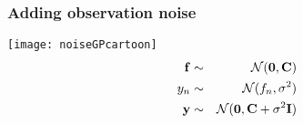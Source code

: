 

\begin{frame}
	\frametitle{Adding observation noise}
	\begin{multicols}{2}
		\texttt{[image: noiseGPcartoon]}
		\newpage
		\begin{eqnarray}
			\nonumber \mathbf{f} &\sim& {\cal N}(\mathbf{0},\mathbf{C})\\
			\nonumber y_n &\sim& {\cal N}(f_n,\sigma^2)\\
			\nonumber \mathbf{y} & \sim & {\cal N}(\mathbf{0},\mathbf{C} + \sigma^2\mathbf{I})
		\end{eqnarray}
	\end{multicols}
\end{frame}

